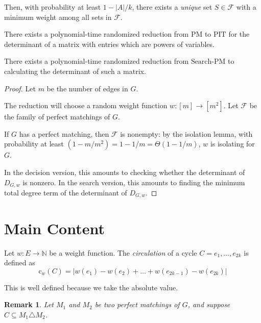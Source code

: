\documentclass{beamer}
\newtheorem{remark}{Remark}
\newcommand{\nn}{\mathbb{N}}
\newcommand{\cl}{\text{c}}
\begin{document}
\begin{frame}
\begin{lemma}
    Then, with probability at least $1 - |A|/k$,
    there exists a \emph{unique} set $S \in \mathcal{F}$
    with a minimum weight among all sets in $\mathcal{F}$.
  \end{lemma}


  \begin{corollary}
    There exists a polynomial-time randomized reduction from
    $\text{PM}$ to $\text{PIT}$ for the determinant of a matrix
    with entries which are powers of variables.

    There exists a polynomial-time randomized reduction from
    $\text{Search-PM}$ to calculating the determinant of such a matrix.
  \end{corollary}

  \begin{proof}
    Let $m$ be the number of edges in $G$.

    The reduction will choose a random weight function $w : [m] \to [m^2]$.
    Let $\mathcal{F}$ be the family of perfect matchings of $G$.

    If $G$ has a perfect matching, then $\mathcal{F}$ is nonempty:
    by the isolation lemma, with probability at least $(1 - m/m^2) = 1 - 1/m =
      \Theta(1 - 1/m)$, $w$ is isolating for $G$.

    In the decision version, this amounts to checking whether the
    determinant of $D_{G,w}$ is nonzero.
    In the search version, this amounts to finding the minimum total
    degree term of the determinant of $D_{G,w}$.
  \end{proof}

  \section{Main Content}

  \begin{definition}
    Let $w : E \to \nn$ be a weight function.
    The \emph{circulation} of a cycle $C = {e_1, \ldots, e_{2k}}$ is defined as
    \[
      \cl_w(C) = |w(e_1) - w(e_2) + \ldots + w(e_{2k - 1}) - w(e_{2k})|
    \]

    This is well defined because we take the absolute value.
  \end{definition}

  \begin{remark}
    Let $M_1$ and $M_2$ be two perfect matchings of $G$,
    and suppose $C\subseteq M_1 \triangle M_2$.


\end{remark}
\end{frame}
\end{document}
